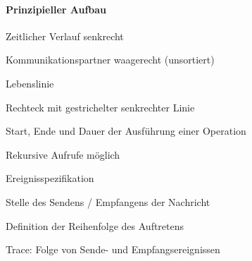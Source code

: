 \documentclass[a4paper]{article}
\begin{document}
\begin{multicols}{3}
  \paragraph{Prinzipieller Aufbau}
  \begin{itemize*}
    \item Zeitlicher Verlauf senkrecht
    \item Kommunikationspartner waagerecht (unsortiert)
    \item Lebenslinie
          \begin{itemize*}
            \item Rechteck mit gestrichelter senkrechter Linie
            \item Start, Ende und Dauer der Ausführung einer Operation
            \item Rekursive Aufrufe möglich
          \end{itemize*}
    \item Ereignisspezifikation
          \begin{itemize*}
            \item Stelle des Sendens / Empfangens der Nachricht
            \item Definition der Reihenfolge des Auftretens
            \item Trace: Folge von Sende- und Empfangsereignissen
          \end{itemize*}
  \end{itemize*}


\end{multicols}
\end{document}
